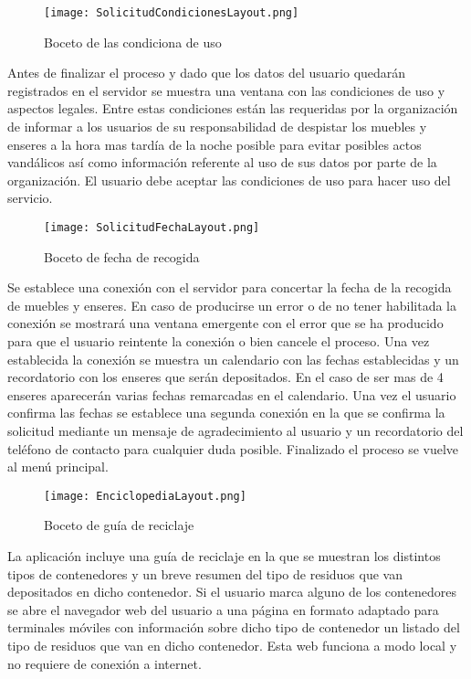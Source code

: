  \begin{figure}[H]
\centering
	\texttt{[image: SolicitudCondicionesLayout.png]} 
\caption{Boceto de las condiciona de uso}
\end{figure}
Antes de finalizar el proceso y dado que los datos del usuario quedarán registrados en el servidor se muestra una ventana con las condiciones de uso y aspectos legales. Entre estas condiciones están las requeridas por la organización de informar a los usuarios de su responsabilidad de despistar los muebles y enseres a la hora mas tardía de la noche posible para evitar posibles actos vandálicos así como información referente al uso de sus datos por parte de la organización. El usuario debe aceptar las condiciones de uso para hacer uso del servicio.

  \begin{figure}[H]
\centering
	\texttt{[image: SolicitudFechaLayout.png]} 
\caption{Boceto de fecha de recogida}
\end{figure}
Se establece una conexión con el servidor para concertar la fecha de la recogida de muebles y enseres. En caso de producirse un error o de no tener habilitada la conexión se mostrará una ventana emergente con el error que se ha producido para que el usuario reintente la conexión o bien cancele el proceso. Una vez establecida la conexión se muestra un calendario con las fechas establecidas  y un recordatorio con los enseres que serán depositados. En el caso de ser mas de 4 enseres aparecerán varias fechas remarcadas en el calendario. Una vez el usuario confirma las fechas se establece una segunda conexión en la que se confirma la solicitud mediante un mensaje de agradecimiento al usuario y un recordatorio del teléfono de contacto para cualquier duda posible. Finalizado el proceso se vuelve al menú principal. 

  \begin{figure}[H]
\centering
	\texttt{[image: EnciclopediaLayout.png]} 
\caption{Boceto de guía de reciclaje}
\end{figure}
La aplicación incluye una guía de reciclaje en la que se muestran los distintos tipos de contenedores y un breve resumen del tipo de residuos que van depositados en dicho contenedor. Si el usuario marca alguno de los contenedores se abre el navegador web del usuario a una página en formato adaptado para terminales móviles con información sobre dicho tipo de contenedor un listado del tipo de residuos que van en dicho contenedor. Esta web funciona a modo local y no requiere de conexión a internet.

